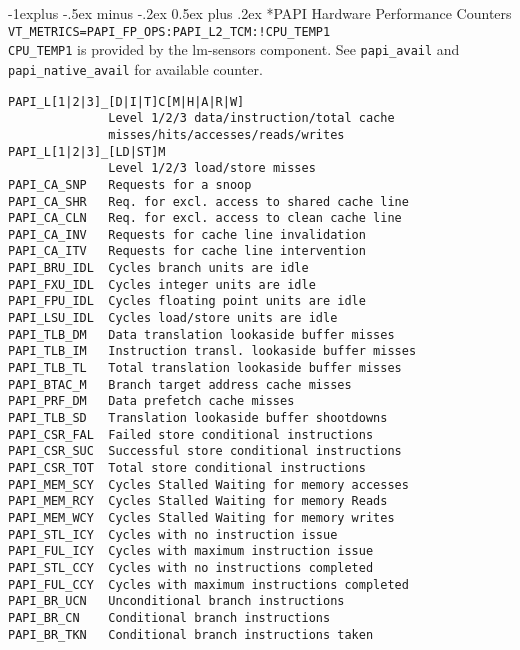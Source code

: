 \documentclass[a4paper,10pt,landscape]{article}
\makeatletter
\renewcommand{\subsection}{\@startsection{subsection}{2}{0mm}%
                                {-1explus -.5ex minus -.2ex}%
                                {0.5ex plus .2ex}%
                                {\normalfont\normalsize\bfseries}}
\makeatother
\begin{document}
\begin{multicols}{3}
\subsection*{PAPI Hardware Performance Counters}
\verb|VT_METRICS=PAPI_FP_OPS:PAPI_L2_TCM:!CPU_TEMP1|\\
\texttt{CPU\_TEMP1} is provided by the lm-sensors component. See \texttt{papi\_avail} and \texttt{papi\_native\_avail} for available counter.
\begin{scriptsize}
\begin{verbatim}
PAPI_L[1|2|3]_[D|I|T]C[M|H|A|R|W]    
              Level 1/2/3 data/instruction/total cache 
              misses/hits/accesses/reads/writes
PAPI_L[1|2|3]_[LD|ST]M    
              Level 1/2/3 load/store misses                       
PAPI_CA_SNP   Requests for a snoop                                
PAPI_CA_SHR   Req. for excl. access to shared cache line  
PAPI_CA_CLN   Req. for excl. access to clean cache line   
PAPI_CA_INV   Requests for cache line invalidation                
PAPI_CA_ITV   Requests for cache line intervention                
PAPI_BRU_IDL  Cycles branch units are idle                        
PAPI_FXU_IDL  Cycles integer units are idle                       
PAPI_FPU_IDL  Cycles floating point units are idle                
PAPI_LSU_IDL  Cycles load/store units are idle                    
PAPI_TLB_DM   Data translation lookaside buffer misses            
PAPI_TLB_IM   Instruction transl. lookaside buffer misses     
PAPI_TLB_TL   Total translation lookaside buffer misses           
PAPI_BTAC_M   Branch target address cache misses                  
PAPI_PRF_DM   Data prefetch cache misses                          
PAPI_TLB_SD   Translation lookaside buffer shootdowns             
PAPI_CSR_FAL  Failed store conditional instructions               
PAPI_CSR_SUC  Successful store conditional instructions           
PAPI_CSR_TOT  Total store conditional instructions                
PAPI_MEM_SCY  Cycles Stalled Waiting for memory accesses          
PAPI_MEM_RCY  Cycles Stalled Waiting for memory Reads             
PAPI_MEM_WCY  Cycles Stalled Waiting for memory writes            
PAPI_STL_ICY  Cycles with no instruction issue                    
PAPI_FUL_ICY  Cycles with maximum instruction issue               
PAPI_STL_CCY  Cycles with no instructions completed               
PAPI_FUL_CCY  Cycles with maximum instructions completed          
PAPI_BR_UCN   Unconditional branch instructions                   
PAPI_BR_CN    Conditional branch instructions                     
PAPI_BR_TKN   Conditional branch instructions taken               

\end{verbatim}
\end{scriptsize}
\end{multicols}
\end{document}
